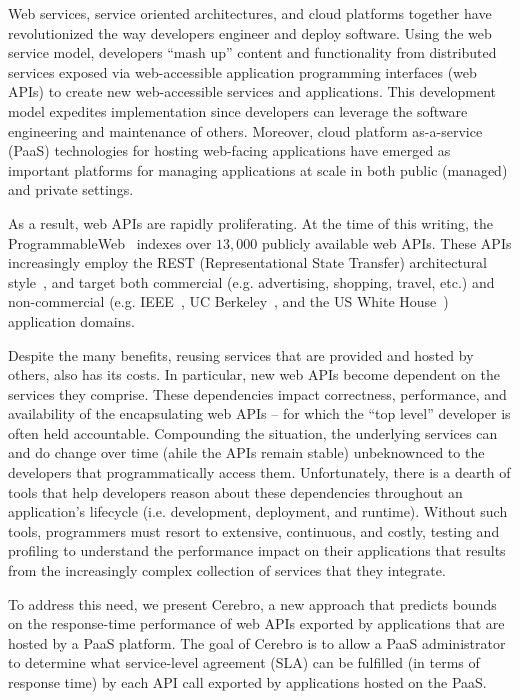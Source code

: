 Web services, service oriented architectures, and cloud platforms together have
revolutionized the way developers engineer and deploy software.
Using the web service model, developers ``mash up'' content and functionality 
from distributed services 
exposed via web-accessible application programming interfaces (web APIs)
to create new web-accessible services and applications.  
This development model expedites implementation since 
developers can leverage the 
software engineering and maintenance of others.
Moreover, cloud platform as-a-service (PaaS) technologies 
for hosting web-facing applications have emerged as important
platforms for managing applications at scale in both public (managed) and 
private settings.  

As a result, web APIs are rapidly 
proliferating.  At the time of this writing, 
the ProgrammableWeb~\cite{pweb} indexes over $13,000$
publicly available web APIs.
These APIs increasingly employ the REST (Representational State Transfer) 
architectural style~\cite{Fielding:2000:ASD:932295}, and target both
commercial (e.g. advertising, shopping, travel, etc.) and non-commercial
(e.g. IEEE~\cite{ieeeapis}, UC Berkeley~\cite{ucbapis}, and the US White
House~\cite{whitehouseapis}) application domains.

Despite the many benefits, reusing services that are provided and hosted
by others, also has its costs.  
In particular, new web APIs become dependent on the 
services they comprise.  These dependencies
impact correctness, performance, and availability of the encapsulating 
web APIs -- for which the ``top level'' developer is often held accountable.  
Compounding the situation, the underlying services can and do change over time
(ahile the APIs remain stable)
unbeknownced to the developers that programmatically access them.
Unfortunately, there is a dearth of tools that help developers reason about these 
dependencies throughout an application's 
lifecycle (i.e. development, deployment, and runtime).  Without such tools, 
programmers must resort to extensive, continuous, and costly, testing and profiling 
to understand the performance impact on their applications
that results from the increasingly complex collection of
services that they integrate.

To address this need, we present Cerebro, a new approach that
predicts bounds on 
the response-time performance of web
APIs exported by applications that are hosted by a PaaS platform.
The goal of Cerebro is to allow 
a PaaS administrator to determine what service-level agreement (SLA) can be
fulfilled (in terms of response time) 
by each API call exported by applications
hosted on the PaaS.  

